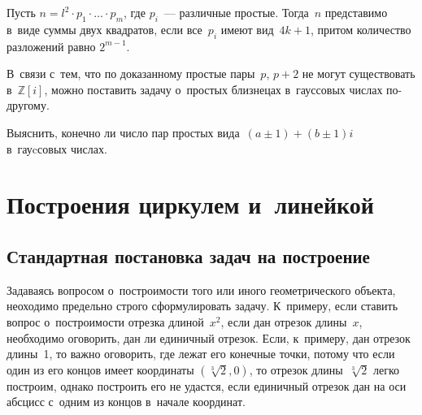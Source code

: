 \documentclass{article}
\begin{document}
\begin{exercise}
  Пусть $n = l^2 \cdot p_1 \cdot \ldots \cdot p_m$, где $p_i$~--- различные
  простые. Тогда~$n$ представимо в~виде суммы двух квадратов, если все~$p_i$
  имеют вид~$4k + 1$, притом количество разложений равно $2^{m-1}$.
\end{exercise}

В~связи с~тем, что по доказанному простые пары~$p$, $p+2$ не могут существовать
в~$\mathbb{Z}[i]$, можно поставить задачу о~простых близнецах в~гауссовых числах
по-другому.
\begin{exercise}
  Выяснить, конечно ли число пар простых вида~$(a \pm 1) + (b \pm 1)i$
  в~гауcсовых числах.
\end{exercise}

\section{Построения циркулем и~линейкой}

\subsection{Стандартная постановка задач на построение}

Задаваясь вопросом о~построимости того или иного геометрического объекта,
неоходимо предельно строго сформулировать задачу. К~примеру, если ставить вопрос
о~построимости отрезка длиной~$x^2$, если дан отрезок длины~$x$, необходимо
оговорить, дан ли единичный отрезок. Если, к~примеру, дан отрезок длины~1, то
важно оговорить, где лежат его конечные точки, потому что если один из его
концов имеет координаты $(\sqrt[3]{2}, 0)$, то отрезок длины~$\sqrt[3]{2}$ легко
построим, однако построить его не удастся, если единичный отрезок дан на оси
абсцисс с~одним из концов в~начале координат.
\end{document}
